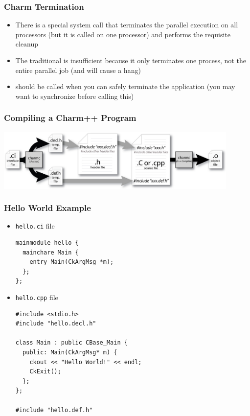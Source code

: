 \begin{frame}[fragile]
   \frametitle{Charm Termination}
   \begin{itemize}
   \item There is a special system call  that terminates the
     parallel execution on all processors (but it is called on one processor)
     and performs the requisite cleanup
   \item The traditional  is insufficient because it only
     terminates one process, not the entire parallel job (and will cause a
     hang)
   \item {} should be called when you can safely terminate the
     application (you may want to synchronize before calling this)
   \end{itemize}
\end{frame}

\begin{frame}
   \frametitle{Compiling a Charm++ Program}
   \begin{center}
     \includegraphics[width=0.9\textwidth]{figures/charmCompile.jpg}
   \end{center}
\end{frame}

\begin{frame}[fragile]
   \frametitle{Hello World Example}\scriptsize
\begin{itemize}
\item \texttt{hello.ci} file
   \begin{lstlisting}
mainmodule hello {
  mainchare Main {
    entry Main(CkArgMsg *m);
  };
};
   \end{lstlisting}
\item \texttt{hello.cpp} file
\lstset{basicstyle=\footnotesize}
   \begin{lstlisting}
#include <stdio.h>
#include "hello.decl.h"

class Main : public CBase_Main {
  public: Main(CkArgMsg* m) {
    ckout << "Hello World!" << endl;
    CkExit();
  };
};

#include "hello.def.h"
   \end{lstlisting}
\end{itemize}
\end{frame}

